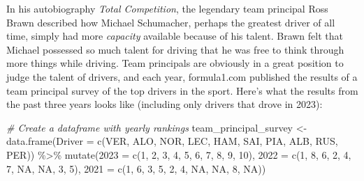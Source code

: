 \documentclass[
]{book}
\newenvironment{Shaded}{\begin{snugshade}}{\end{snugshade}}
\newcommand{\AttributeTok}[1]{\textcolor[rgb]{0.77,0.63,0.00}{#1}}
\newcommand{\CommentTok}[1]{\textcolor[rgb]{0.56,0.35,0.01}{\textit{#1}}}
\newcommand{\ConstantTok}[1]{\textcolor[rgb]{0.00,0.00,0.00}{#1}}
\newcommand{\DecValTok}[1]{\textcolor[rgb]{0.00,0.00,0.81}{#1}}
\newcommand{\FunctionTok}[1]{\textcolor[rgb]{0.00,0.00,0.00}{#1}}
\newcommand{\NormalTok}[1]{#1}
\newcommand{\OtherTok}[1]{\textcolor[rgb]{0.56,0.35,0.01}{#1}}
\newcommand{\SpecialCharTok}[1]{\textcolor[rgb]{0.00,0.00,0.00}{#1}}
\newcommand{\StringTok}[1]{\textcolor[rgb]{0.31,0.60,0.02}{#1}}
\begin{document}
In his autobiography \emph{Total Competition}, the legendary team principal Ross Brawn described how Michael Schumacher, perhaps the greatest driver of all time, simply had more \emph{capacity} available because of his talent. Brawn felt that Michael possessed so much talent for driving that he was free to think through more things while driving. Team principals are obviously in a great position to judge the talent of drivers, and each year, formula1.com published the results of a team principal survey of the top drivers in the sport. Here's what the results from the past three years looks like (including only drivers that drove in 2023):

\begin{Shaded}
\begin{Highlighting}[]
\CommentTok{\# Create a dataframe with yearly rankings}
\NormalTok{team\_principal\_survey }\OtherTok{\textless{}{-}} \FunctionTok{data.frame}\NormalTok{(}\AttributeTok{Driver =} \FunctionTok{c}\NormalTok{(}\StringTok{\textquotesingle{}VER\textquotesingle{}}\NormalTok{, }\StringTok{\textquotesingle{}ALO\textquotesingle{}}\NormalTok{, }\StringTok{\textquotesingle{}NOR\textquotesingle{}}\NormalTok{, }\StringTok{\textquotesingle{}LEC\textquotesingle{}}\NormalTok{, }\StringTok{\textquotesingle{}HAM\textquotesingle{}}\NormalTok{,}
                                               \StringTok{\textquotesingle{}SAI\textquotesingle{}}\NormalTok{, }\StringTok{\textquotesingle{}PIA\textquotesingle{}}\NormalTok{, }\StringTok{\textquotesingle{}ALB\textquotesingle{}}\NormalTok{, }\StringTok{\textquotesingle{}RUS\textquotesingle{}}\NormalTok{, }\StringTok{\textquotesingle{}PER\textquotesingle{}}\NormalTok{)) }\SpecialCharTok{\%\textgreater{}\%}
  \FunctionTok{mutate}\NormalTok{(}\StringTok{\textasciigrave{}}\AttributeTok{2023}\StringTok{\textasciigrave{}} \OtherTok{=} \FunctionTok{c}\NormalTok{(}\DecValTok{1}\NormalTok{, }\DecValTok{2}\NormalTok{, }\DecValTok{3}\NormalTok{, }\DecValTok{4}\NormalTok{, }\DecValTok{5}\NormalTok{, }\DecValTok{6}\NormalTok{, }\DecValTok{7}\NormalTok{, }\DecValTok{8}\NormalTok{, }\DecValTok{9}\NormalTok{, }\DecValTok{10}\NormalTok{),}
         \StringTok{\textasciigrave{}}\AttributeTok{2022}\StringTok{\textasciigrave{}} \OtherTok{=} \FunctionTok{c}\NormalTok{(}\DecValTok{1}\NormalTok{, }\DecValTok{8}\NormalTok{, }\DecValTok{6}\NormalTok{, }\DecValTok{2}\NormalTok{, }\DecValTok{4}\NormalTok{, }\DecValTok{7}\NormalTok{, }\ConstantTok{NA}\NormalTok{, }\ConstantTok{NA}\NormalTok{, }\DecValTok{3}\NormalTok{, }\DecValTok{5}\NormalTok{),}
         \StringTok{\textasciigrave{}}\AttributeTok{2021}\StringTok{\textasciigrave{}} \OtherTok{=} \FunctionTok{c}\NormalTok{(}\DecValTok{1}\NormalTok{, }\DecValTok{6}\NormalTok{, }\DecValTok{3}\NormalTok{, }\DecValTok{5}\NormalTok{, }\DecValTok{2}\NormalTok{, }\DecValTok{4}\NormalTok{, }\ConstantTok{NA}\NormalTok{, }\ConstantTok{NA}\NormalTok{, }\DecValTok{8}\NormalTok{, }\ConstantTok{NA}\NormalTok{))}


\end{Highlighting}
\end{Shaded}
\end{document}
